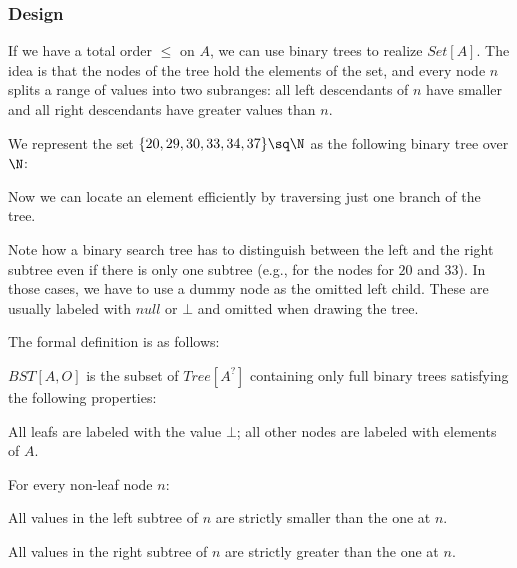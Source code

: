 \subsubsection{Design}
If we have a total order $\leq$ on $A$, we can use binary trees to realize $Set[A]$.
The idea is that the nodes of the tree hold the elements of the set, and every node $n$ splits a range of values into two subranges: all left descendants of $n$ have smaller and all right descendants have greater values than $n$.

\begin{example}
We represent the set $\{20,29,30,33,34,37\}\sq \N$ as the following binary tree over $\N$:

\begin{center}
\end{center}
Now we can locate an element efficiently by traversing just one branch of the tree.

Note how a binary search tree has to distinguish between the left and the right subtree even if there is only one subtree (e.g., for the nodes for $20$ and $33$).
In those cases, we have to use a dummy node as the omitted left child.
These are usually labeled with $null$ or $\bot$ and omitted when drawing the tree.
\end{example}

The formal definition is as follows:

\begin{definition}
$BST[A,O]$ is the subset of $Tree[A^?]$ containing only full binary trees satisfying the following properties:
\begin{compactitem}
 \item All leafs are labeled with the value $\bot$; all other nodes are labeled with elements of $A$.
 \item For every non-leaf node $n$:
  \begin{compactitem}
    \item All values in the left subtree of $n$ are strictly smaller than the one at $n$.
    \item All values in the right subtree of $n$ are strictly greater than the one at $n$.
  \end{compactitem}
\end{compactitem}
\end{definition}

